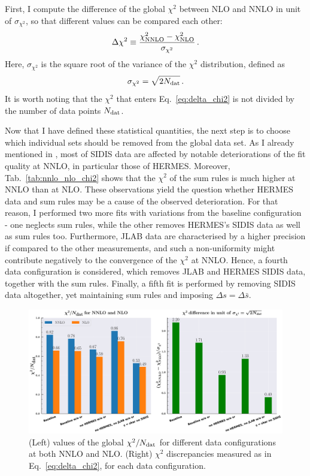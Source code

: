 First, I compute the difference of the global $\chi^2$ between NLO and NNLO in unit of $\sigma_{\chi^2}$, so that different values can be compared each other:
%
\begin{equation}
  \Delta \chi^2 \equiv \frac{\chi^2_{\textrm{NNLO}} - \chi^2_{\textrm{NLO}}}{\sigma_{\chi^2}}\,.
  \label{eq:delta_chi2}
\end{equation}
%
Here, $\sigma_{\chi^2}$ is the square root of the variance of the $\chi^2$ distribution, defined as
%
\begin{equation}
  \sigma_{\chi^2} = \sqrt{2 N_{\textrm{dat}}}\,.
\end{equation}
%
It is worth noting that the $\chi^2$ that enters Eq.~\eqref{eq:delta_chi2} is not divided by the number of data points $N_{\textrm{dat}}$.%

Now that I have defined these statistical quantities, the next step is to choose which individual sets should be removed from the global data set. As I already mentioned in , most of SIDIS data are affected by notable deteriorations of the fit quality at NNLO, in particular those of HERMES. Moreover, Tab.~\ref{tab:nnlo_nlo_chi2} shows that the $\chi^2$ of the sum rules is much higher at NNLO than at NLO. These observations yield the question whether HERMES data and sum rules may be a cause of the observed deterioration. For that reason, I performed two more fits with variations from the baseline configuration - one neglects sum rules, while the other removes HERMES's SIDIS data as well as sum rules too. Furthermore, JLAB data are characterised by a higher precision if compared to the other measurements, and such a non-uniformity might contribute negatively to the convergence of the $\chi^2$ at NNLO. Hence, a fourth data configuration is considered, which removes JLAB and HERMES SIDIS data, together with the sum rules. Finally, a fifth fit is performed by removing SIDIS data altogether, yet maintaining sum rules and imposing $\Delta s = \Delta \bar{s}$.%

\begin{figure}[t]
  \centering
  \includegraphics[width=\textwidth]{Chapters/Chapter_4/figs/chi2_discrepancy.pdf}
  \caption{\small{(Left) values of the global $\chi^2 / N_{\textrm{dat}}$ for different data configurations at both NNLO and NLO. (Right) $\chi^2$ discrepancies measured as in Eq.~\eqref{eq:delta_chi2}, for each data configuration.}}
  \label{fig:discrepancy}
\end{figure}

